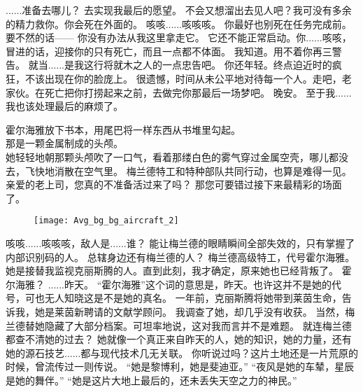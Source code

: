 \documentclass[openany]{book}
\begin{document}
\begin{dialogue}
     ......准备去哪儿？
     去实现我最后的愿望。
     不会又想溜出去见人吧？我可没有多余的精力救你。你会死在外面的。
     咳咳......咳咳咳。
     你最好也别死在任务完成前。
     要不然的话——
     你没有办法从我这里拿走它。
     它还不能正常启动。你......咳咳，冒进的话，迎接你的只有死亡，而且一点都不体面。
     我知道。用不着你再三警告。
     就当......是我这行将就木之人的一点忠告吧。
     你还年轻。终点迫近时的疯狂，不该出现在你的脸庞上。
     很遗憾，时间从未公平地对待每一个人。走吧，老家伙。在死亡把你打捞起来之前，去做完你那最后一场梦吧。
     晚安。
     至于我......我也该处理最后的麻烦了。\par
    霍尔海雅放下书本，用尾巴将一样东西从书堆里勾起。\\
    那是一颗金属制成的头颅。\\
    她轻轻地朝那颗头颅吹了一口气，看着那缕白色的雾气穿过金属空壳，哪儿都没去，飞快地消散在空气里。
     梅兰德特工和特种部队共同行动，也算是难得一见。
     亲爱的老上司，您真的不准备活过来了吗？
     那您可要错过接下来最精彩的场面了。
    \begin{figure}[h]
        \centering
        \texttt{[image: Avg\_bg\_bg\_aircraft\_2]}
    \end{figure}
     咳咳......咳咳咳，敌人是......谁？
     能让梅兰德的眼睛瞬间全部失效的，只有掌握了内部识别码的人。
     总辖身边还有梅兰德的人？
     梅兰德高级特工，代号霍尔海雅。她是接替我监视克丽斯腾的人。直到此刻，我才确定，原来她也已经背叛了。
     霍尔海雅？
     ......昨天。
     “霍尔海雅”这个词的意思是，昨天。也许这并不是她的代号，可也无人知晓这是不是她的真名。
     一年前，克丽斯腾将她带到莱茵生命，告诉我，她是莱茵新聘请的文献学顾问。
     我调查了她，却几乎没有收获。
     当然，梅兰德替她隐藏了大部分档案。可坦率地说，这对我而言并不是难题。
     就连梅兰德都查不清她的过去？
     她就像一个真正来自昨天的人，她的知识，她的力量，还有她的源石技艺......都与现代技术几无关联。
     你听说过吗？这片土地还是一片荒原的时候，曾流传过一则传说。
     “她是黎博利，她是斐迪亚。”
     “夜风是她的车辇，星辰是她的舞伴。”
     “她是这片大地上最后的，还未丢失天空之力的神民。”

\end{dialogue}
\end{document}
